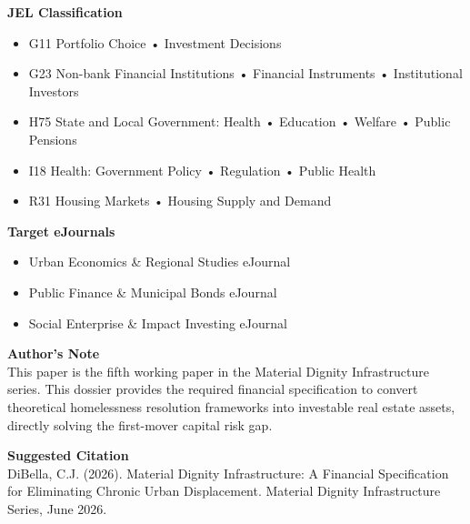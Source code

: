 \documentclass[12pt, letterpaper]{article}
\begin{document}
\vspace{8pt}
\noindent\textbf{JEL Classification}
\begin{itemize}[nosep, before={\vspace{-8pt}}, leftmargin=2em]
    \item G11 Portfolio Choice • Investment Decisions
    \item G23 Non-bank Financial Institutions • Financial Instruments • Institutional Investors
    \item H75 State and Local Government: Health • Education • Welfare • Public Pensions
    \item I18 Health: Government Policy • Regulation • Public Health
    \item R31 Housing Markets • Housing Supply and Demand
\end{itemize}

\vspace{8pt}
\noindent\textbf{Target eJournals}
\begin{itemize}[nosep, before={\vspace{-8pt}}, leftmargin=2em]
    \item Urban Economics \& Regional Studies eJournal
    \item Public Finance \& Municipal Bonds eJournal
    \item Social Enterprise \& Impact Investing eJournal
\end{itemize}

\vspace{8pt}
\noindent\textbf{Author's Note}\\[1pt]
This paper is the fifth working paper in the Material Dignity Infrastructure series. This dossier provides the required financial specification to convert theoretical homelessness resolution frameworks into investable real estate assets, directly solving the first-mover capital risk gap.

\vspace{8pt}
\noindent\textbf{Suggested Citation}\\[1pt]
DiBella, C.J. (2026). Material Dignity Infrastructure: A Financial Specification for Eliminating Chronic Urban Displacement. Material Dignity Infrastructure Series, June 2026.

\newpage
\vspace{12pt}
\begingroup
{}
\setlength{\cftbeforesecskip}{2pt}
\setlength{\cftbeforesubsecskip}{-2pt}
\tableofcontents
\endgroup
\end{document}
